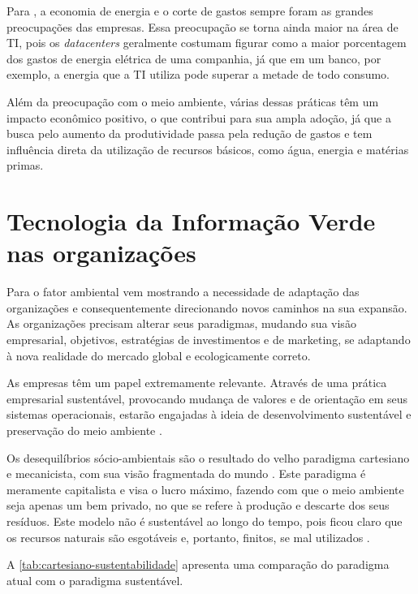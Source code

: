 Para , a economia de energia e o corte de gastos sempre foram as grandes preocupações das empresas. Essa preocupação se torna ainda maior na área de TI, pois os \textit{datacenters} geralmente costumam figurar como a maior porcentagem dos gastos de energia elétrica de uma companhia, já que em um banco, por exemplo, a energia que a TI utiliza pode superar a metade de todo consumo.  

Além da preocupação com o meio ambiente, várias dessas práticas têm um impacto econômico positivo, o que contribui para sua ampla adoção, já que a busca pelo aumento da produtividade passa pela redução de gastos e tem influência direta da utilização de recursos básicos, como água, energia e matérias primas.

\section{Tecnologia da Informação Verde nas organizações}

Para  o fator ambiental vem mostrando a necessidade de adaptação das organizações e consequentemente direcionando novos caminhos na sua expansão. As organizações precisam alterar seus paradigmas, mudando sua visão empresarial, objetivos, estratégias de investimentos e de marketing, se adaptando à nova realidade do mercado global e ecologicamente correto.

\begin{citacao}
As empresas têm um papel extremamente relevante. Através de uma prática empresarial sustentável, provocando mudança de valores e de orientação em seus sistemas operacionais, estarão engajadas à ideia de desenvolvimento sustentável e preservação do meio ambiente \cite[p. 3]{kraemer2005responsabilidade}. 
\end{citacao}

Os desequilíbrios sócio-ambientais são o resultado do velho paradigma cartesiano e mecanicista, com sua visão fragmentada do mundo \cite[p. 28]{almeida2002bom}. Este paradigma é meramente capitalista e visa o lucro máximo, fazendo com que o meio ambiente seja apenas um bem privado, no que se refere à produção e descarte dos seus resíduos. Este modelo não é sustentável ao longo do tempo, pois ficou claro que os recursos naturais são esgotáveis e, portanto, finitos, se mal utilizados \cite{kraemer2005responsabilidade}.

A \autoref{tab:cartesiano-sustentabilidade} apresenta uma comparação do paradigma atual com o paradigma sustentável.

